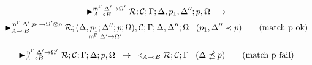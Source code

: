 
\begin{multline}
\transx{\matstate{A \lolli B}{\rulestk}{\lstack{C}}{\Gamma}{\Delta, p_1, \Delta''}{p,
   \Omega}{\Delta' \rightarrow \Omega'}}
{\matstate{A \lolli B}{\rulestk}{\lframe{\Delta,
   p_1}{\Delta''}{p}{\Omega}{\Delta'}{\Omega'}, \lstack{C}}{\Gamma}{\Delta,
   \Delta''}{\Omega}{\Delta', p_1 \rightarrow \Omega' \otimes p}} \;\;\; (p_1, \Delta'' \prec p)
   \tag{match p ok}
\end{multline}

\begin{align}
\trans{\matstate{A \lolli B}{\rulestk}{\lstack{C}}{\Gamma}{\Delta}{p,
   \Omega}{\Delta' \rightarrow \Omega'}}
{\contstate{A \lolli B}{\rulestk}{\lstack{C}}{\Gamma}} \;\;\; (\Delta \npreceq
      p) \tag{match p fail}
\end{align}
